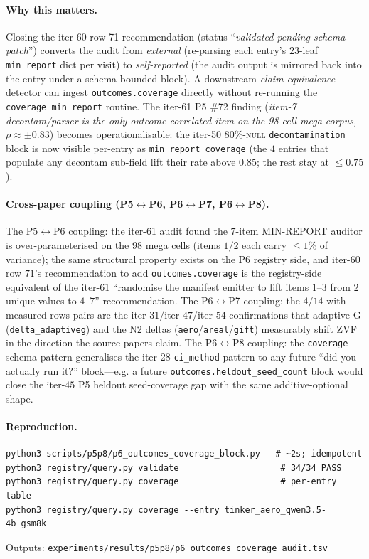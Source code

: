 \documentclass{article}
\begin{document}
\paragraph{Why this matters.}
Closing the iter-60 row 71 recommendation (status
``\emph{validated pending schema patch}'') converts the audit from
\emph{external} (re-parsing each entry's $23$-leaf
\texttt{min\_report} dict per visit) to \emph{self-reported} (the
audit output is mirrored back into the entry under a schema-bounded
block). A downstream \emph{claim-equivalence} detector can ingest
\texttt{outcomes.coverage} directly without re-running the
\texttt{coverage\_min\_report} routine. The iter-61 P5 \#72 finding
(\emph{item-7 decontam/parser is the only outcome-correlated item on
the 98-cell mega corpus, $\rho\approx\pm0.83$}) becomes
operationalisable: the iter-50 $80\%$-\textsc{null}
\texttt{decontamination} block is now visible per-entry as
\texttt{min\_report\_coverage} (the $4$ entries that populate any
decontam sub-field lift their rate above $0.85$; the rest stay at
$\le0.75$).

\paragraph{Cross-paper coupling (P5$\leftrightarrow$P6,
P6$\leftrightarrow$P7, P6$\leftrightarrow$P8).}
The P5$\leftrightarrow$P6 coupling: the iter-61 audit found the
$7$-item MIN-REPORT auditor is over-parameterised on the $98$ mega
cells (items $1/2$ each carry $\le 1\%$ of variance); the same
structural property exists on the P6 registry side, and iter-60 row
$71$'s recommendation to add \texttt{outcomes.coverage} is the
registry-side equivalent of the iter-61 ``randomise the manifest
emitter to lift items $1$--$3$ from $2$ unique values to $4$--$7$''
recommendation. The P6$\leftrightarrow$P7 coupling: the $4/14$
with-measured-rows pairs are the iter-$31$/iter-$47$/iter-$54$
confirmations that adaptive-G (\texttt{delta\_adaptiveg}) and the N2
deltas (\texttt{aero}/\texttt{areal}/\texttt{gift}) measurably shift
ZVF in the direction the source papers claim. The
P6$\leftrightarrow$P8 coupling: the \texttt{coverage} schema
pattern generalises the iter-28 \texttt{ci\_method} pattern to any
future ``did you actually run it?'' block---e.g. a future
\texttt{outcomes.heldout\_seed\_count} block would close the
iter-$45$ P5 heldout seed-coverage gap with the same additive-optional
shape.

\paragraph{Reproduction.}
\begin{verbatim}
python3 scripts/p5p8/p6_outcomes_coverage_block.py   # ~2s; idempotent
python3 registry/query.py validate                    # 34/34 PASS
python3 registry/query.py coverage                    # per-entry table
python3 registry/query.py coverage --entry tinker_aero_qwen3.5-4b_gsm8k
\end{verbatim}
Outputs: \texttt{experiments/results/p5p8/p6\_outcomes\_coverage\_audit.tsv}
\end{document}
